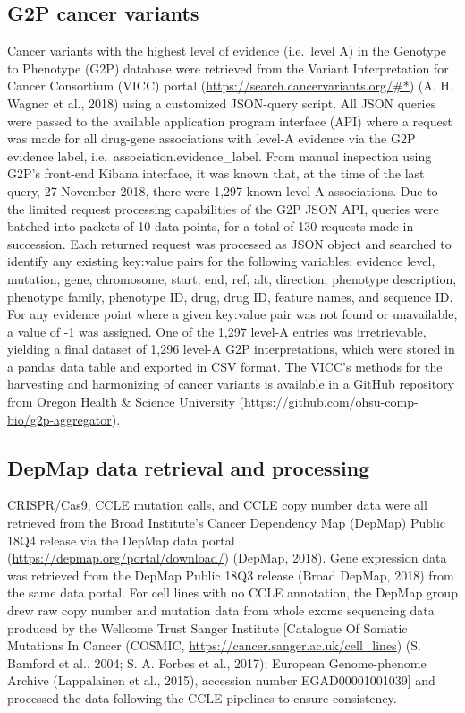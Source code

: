 \documentclass[man]{apa6}
\begin{document}
\subsection{G2P cancer variants}\label{g2p-cancer-variants}

Cancer variants with the highest level of evidence (i.e.~level A) in the
Genotype to Phenotype (G2P) database were retrieved from the Variant
Interpretation for Cancer Consortium (VICC) portal
(\url{https://search.cancervariants.org/\#*}) (A. H. Wagner et al.,
2018) using a customized JSON-query script. All JSON queries were passed
to the available application program interface (API) where a request was
made for all drug-gene associations with level-A evidence via the G2P
evidence label, i.e.~association.evidence\_label. From manual inspection
using G2P's front-end Kibana interface, it was known that, at the time
of the last query, 27 November 2018, there were 1,297 known level-A
associations. Due to the limited request processing capabilities of the
G2P JSON API, queries were batched into packets of 10 data points, for a
total of 130 requests made in succession. Each returned request was
processed as JSON object and searched to identify any existing key:value
pairs for the following variables: evidence level, mutation, gene,
chromosome, start, end, ref, alt, direction, phenotype description,
phenotype family, phenotype ID, drug, drug ID, feature names, and
sequence ID. For any evidence point where a given key:value pair was not
found or unavailable, a value of -1 was assigned. One of the 1,297
level-A entries was irretrievable, yielding a final dataset of 1,296
level-A G2P interpretations, which were stored in a pandas data table
and exported in CSV format. The VICC's methods for the harvesting and
harmonizing of cancer variants is available in a GitHub repository from
Oregon Health \& Science University
(\url{https://github.com/ohsu-comp-bio/g2p-aggregator}).

\subsection{DepMap data retrieval and
processing}\label{depmap-data-retrieval-and-processing}

CRISPR/Cas9, CCLE mutation calls, and CCLE copy number data were all
retrieved from the Broad Institute's Cancer Dependency Map (DepMap)
Public 18Q4 release via the DepMap data portal
(\url{https://depmap.org/portal/download/}) (DepMap, 2018). Gene
expression data was retrieved from the DepMap Public 18Q3 release (Broad
DepMap, 2018) from the same data portal. For cell lines with no CCLE
annotation, the DepMap group drew raw copy number and mutation data from
whole exome sequencing data produced by the Wellcome Trust Sanger
Institute {[}Catalogue Of Somatic Mutations In Cancer (COSMIC,
\url{https://cancer.sanger.ac.uk/cell_lines}) (S. Bamford et al., 2004;
S. A. Forbes et al., 2017); European Genome-phenome Archive (Lappalainen
et al., 2015), accession number EGAD00001001039{]} and processed the
data following the CCLE pipelines to ensure consistency.
\end{document}
